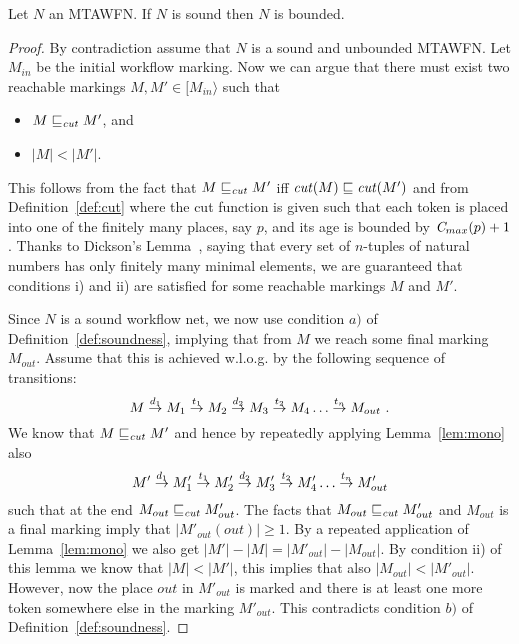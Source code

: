\begin{theorem}\label{thm:soundness}
Let $N$ an MTAWFN. If $N$ is sound then $N$ is bounded. 
\end{theorem}
\begin{proof}
By contradiction assume that $N$ is a sound and unbounded MTAWFN.
Let $M_{in}$ be the initial workflow marking.
Now we can argue that there must exist two
reachable markings $M, M' \in [M_{in}\rangle$
such that
\begin{itemize}
\item[i)] $M \sqsubseteq_{\mathit{cut}} M'$, and
\item[ii)] $|M| < |M'|$.
\end{itemize}

This follows from the fact that $M \sqsubseteq_{\mathit{cut}} M'$ iff
$\mathit{cut}(M) \sqsubseteq \mathit{cut}(M')$ and from Definition~\ref{def:cut}
where the cut function is given such that each token is placed
into one of the finitely many places, say $p$, and its age is bounded
by $\mathit{C}_{max}(p)+1$. Thanks to Dickson's Lemma~\cite{dickson}, saying
that every set of $n$-tuples of natural numbers has only finitely
many minimal elements, we are
guaranteed that conditions i) and ii) are satisfied for some
reachable markings $M$ and $M'$.

Since $N$ is a sound workflow net, we now use condition $a)$
of Definition~\ref{def:soundness}, implying that
from $M$ we reach some final marking $M_{out}$. Assume that this is achieved
w.l.o.g.  by the following sequence of transitions:
 $$M \stackrel{d_1}{\rightarrow} M_1 \stackrel{t_1}{\rightarrow}
  M_2 \stackrel{d_2}{\rightarrow} M_3 \stackrel{t_2}{\rightarrow}
  M_4 \ldots \stackrel{t_n}{\rightarrow} M_{out} \ . $$
We know that $M \sqsubseteq_{\mathit{cut}} M'$ and hence by repeatedly applying
Lemma~\ref{lem:mono}
also
 $$M' \stackrel{d_1}{\rightarrow} M'_1 \stackrel{t_1}{\rightarrow}
  M'_2 \stackrel{d_2}{\rightarrow} M'_3 \stackrel{t_2}{\rightarrow}
  M'_4 \ldots \stackrel{t_n}{\rightarrow} M'_{out}  $$
such that at the end $M_{out} \sqsubseteq_{\mathit{cut}} M'_{out}$. The facts that
$M_{out} \sqsubseteq_{\mathit{cut}} M'_{out}$ and $M_{out}$ is a final marking
imply that $|M'_{out}(out)| \geq 1$.
By a repeated application of Lemma~\ref{lem:mono}
we also get $|M'|-|M|=|M'_{out}|-|M_{out}|$.
By condition ii) of this lemma we know that $|M| < |M'|$,
this implies that also $|M_{out}| < |M'_{out}|$.
However, now the place
$out$ in $M'_{out}$ is marked and there is at least one more token
somewhere else in the marking $M'_{out}$. This contradicts
condition $b)$ of Definition~\ref{def:soundness}.
\end{proof}


